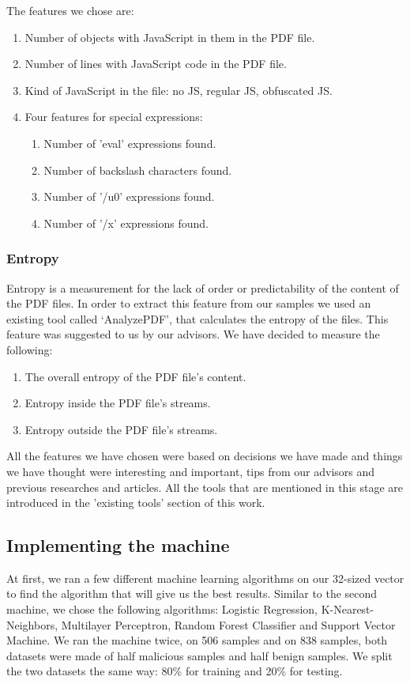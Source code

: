 \documentclass{article}
\begin{document}
\indent	The features we chose are:

\begin{enumerate}
	\item Number of objects with JavaScript in them in the PDF file.
	\item Number of lines with JavaScript code in the PDF file.
	\item Kind of JavaScript in the file: no JS, regular JS, obfuscated JS.
	\item Four features for special expressions:
	\begin{enumerate}
    	\item Number of 'eval' expressions found.
	    \item Number of backslash characters found.
		\item Number of '/u0' expressions found.
		\item Number of '/x' expressions found.
	\end{enumerate}
\end{enumerate}

\subsubsection{Entropy}
\indent	Entropy is a measurement for the lack of order or predictability of the content of the PDF files. In order to extract this feature from our samples we used an existing tool called ‘AnalyzePDF’, that calculates the entropy of the files. This feature was suggested to us by our advisors. We have decided to measure the following:

\begin{enumerate}
	\item The overall entropy of the PDF file's content.
	\item Entropy inside the PDF file's streams.
	\item Entropy outside the PDF file's streams.
\end{enumerate}

\indent	All the features we have chosen were based on decisions we have made and things we have thought were interesting and important, tips from our advisors and previous researches and articles. All the tools that are mentioned in this stage are introduced in the 'existing tools' section of this work.

\subsection{Implementing the machine}
\indent	At first, we ran a few different machine learning algorithms on our 32-sized vector to find the algorithm that will give us the best results. Similar to the second machine, we chose the following algorithms: Logistic Regression, K-Nearest-Neighbors, Multilayer Perceptron, Random Forest Classifier and Support Vector Machine. We ran the machine twice, on 506 samples and on 838 samples, both datasets were made of half malicious samples and half benign samples. We split the two datasets the same way: 80\% for training and 20\% for testing.
\end{document}
